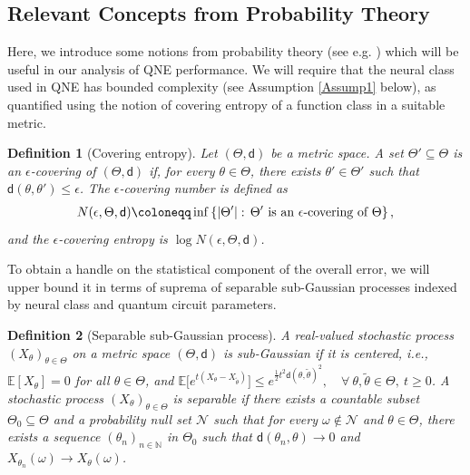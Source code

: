 \documentclass[a4paper,onecolumn,11pt,accepted=2026-05-12]{quantumarticle}
\newtheorem{definition}{Definition}
\newcommand{\cN}{\mathcal{N}}
\newcommand{\EE}{\mathbb{E}}
\newcommand{\NN}{\mathbb{N}}
\begin{document}
\subsection{Relevant Concepts from Probability Theory}
Here, we introduce some  notions from probability theory (see e.g. \cite{VanHandel-book}) which will be useful in our analysis of QNE performance.   We will require that the neural class used in QNE has bounded complexity (see Assumption \ref{Assump1} below), as quantified using the notion of covering entropy \cite{tikhomirov1993varepsilon} of a function class in a suitable metric. 
\begin{definition}
[Covering  entropy] \label{cov-pack-num}
Let $(\Theta,\mathsf{d})$ be a metric space.  A set $\Theta'\subseteq\Theta$ is an $\epsilon$-covering of $(\Theta,\mathsf{d})$  if, for every $\theta \in \Theta$, there exists $\theta' \in \Theta' $ such that $\mathsf{d}(\theta,\theta')\leq \epsilon$.  The $\epsilon$-covering number is defined as
\begin{align}
N(\epsilon,\Theta,\mathsf{d})\coloneqq \inf \left\{|\Theta'|:\,\Theta' \mbox{ is an } \epsilon \mbox{-covering of }\Theta \right\},  \notag
\end{align}
and the $\epsilon$-covering entropy is $\log  N(\epsilon,\Theta,\mathsf{d})$.
\end{definition}
To obtain a handle on the statistical component of the overall error, we will upper bound it in terms of suprema of separable sub-Gaussian processes indexed by neural class and quantum circuit parameters. 
\begin{definition}[Separable sub-Gaussian process]
    A real-valued stochastic process $\left(X_{\theta}\right)_{\theta \in \Theta}$ on a metric space $(\Theta,\mathsf{d})$ is  sub-Gaussian if it is centered, i.e., $\EE[X_{\theta}]=0$ for all $\theta \in \Theta$, and $\mathbb{E}\big[e^{t(X_{\theta}-X_{\tilde{\theta}})}\big] \leq e^{\frac 12 t^2\mathsf{d}(\theta,\tilde{\theta})^2},\quad \forall ~\theta,\tilde{\theta} \in \Theta,~t \geq 0$. A stochastic process $(X_{\theta})_{\theta \in \Theta}$ is separable if there exists a countable subset $\Theta_0 \subseteq \Theta$ and a probability null set $\cN$ such that for every $\omega \notin \cN$ and $\theta \in \Theta$, there exists a sequence $\left(\theta_n\right)_{n \in \NN}$ in $\Theta_0$ such that $\mathsf{d}(\theta_n,\theta) \rightarrow 0$ and $X_{\theta_n}(\omega) \rightarrow X_{\theta}(\omega)$.
\end{definition} 
\end{document}
